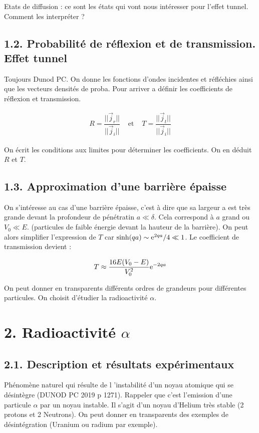 \documentclass[french, a4paper, 10pt, twocolumn, landscape]{article}
\begin{document}
Etats de diffusion : ce sont les états qui vont nous intéresser pour l'effet tunnel. Comment les interpréter ?


\subsection*{1.2. Probabilité de réflexion et de transmission. Effet tunnel}

Toujours Dunod PC. On donne les fonctions d'ondes incidentes et réfléchies ainsi que les vecteurs densités de proba. Pour arriver a définir les coefficients de réflexion et transmission.

\begin{equation}
    \begin{array}{lll}
        R = \dfrac{||\vec{j}_r||}{||\vec{j}_i||}& \text{ et }& T=\dfrac{||\vec{j}_t||}{||\vec{j}_i||}
    \end{array}
\end{equation}

On écrit les conditions aux limites pour déterminer les coefficients. On en déduit $R$ et $T$.

\subsection*{1.3. Approximation d'une barrière épaisse}

On s'intéresse au cas d'une barrière épaisse, c'est à dire que sa largeur a est très grande devant la profondeur de pénétratin $a\ll \delta$. Cela correspond à $a$ grand ou $V_0 \ll E$. (particules de faible énergie devant la hauteur de la barrière).   On peut alors simplifier l'expression de $T$ car $\sinh(qa)\sim {\rm e}^{2qa}/4\ll 1$. Le coefficient de transmission devient : 

\begin{equation}
    T\approx \dfrac{16E(V_0-E)}{V_0^2}{\rm e}^{-2qa}
\end{equation}

On peut donner en transparents différents ordres de grandeurs pour différentes particules. On choisit d'étudier la radioactivité $\alpha$.

\section*{2. Radioactivité $\alpha$}



\subsection*{2.1. Description et résultats expérimentaux}
Phénomène naturel qui résulte de l 'instabilité d'un noyau atomique qui se désintègre (DUNOD PC 2019 p 1271). Rappeler que c'est l'emission d'une particule $\alpha$ par un noyau instable. Il s'agit d'un noyau d'Helium très stable (2 protons et 2 Neutrons). On peut donner en transparents des exemples de désintégration (Uranium ou radium par exemple).
\end{document}

